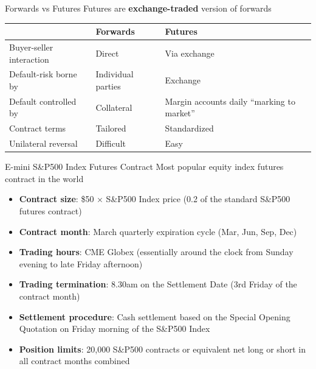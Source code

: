 \documentclass[
  ignorenonframetext,
  aspectratio=169]{beamer}
\providecommand{\tightlist}{%
  \setlength{\itemsep}{0pt}\setlength{\parskip}{0pt}}
\begin{document}
\begin{frame}{Forwards vs Futures}
\protect\hypertarget{forwards-vs-futures}{}
Futures are \textbf{exchange-traded} version of forwards

\begin{longtable}[]{@{}lll@{}}
\toprule
& \textbf{Forwards} & \textbf{Futures} \\
\midrule
\endhead
Buyer-seller interaction & Direct & Via exchange \\
Default-risk borne by & Individual parties & Exchange \\
Default controlled by & Collateral & Margin accounts daily ``marking to
market'' \\
Contract terms & Tailored & Standardized \\
Unilateral reversal & Difficult & Easy \\
\bottomrule
\end{longtable}
\end{frame}

\begin{frame}{E-mini S\&P500 Index Futures Contract}
\protect\hypertarget{e-mini-sp500-index-futures-contract}{}
Most popular equity index futures contract in the world

\begin{itemize}
\tightlist
\item
  \textbf{Contract size}: \$50 \(\times\) S\&P500 Index price (0.2 of
  the standard S\&P500 futures contract)
\item
  \textbf{Contract month}: March quarterly expiration cycle (Mar, Jun,
  Sep, Dec)
\item
  \textbf{Trading hours}: CME Globex (essentially around the clock from
  Sunday evening to late Friday afternoon)
\item
  \textbf{Trading termination}: 8.30am on the Settlement Date (3rd
  Friday of the contract month)
\item
  \textbf{Settlement procedure}: Cash settlement based on the Special
  Opening Quotation on Friday morning of the S\&P500 Index
\item
  \textbf{Position limits}: 20,000 S\&P500 contracts or equivalent net
  long or short in all contract months combined
\end{itemize}
\end{frame}
\end{document}

